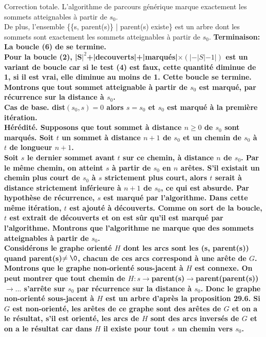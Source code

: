 \documentclass[french, 11pt]{article}
\begin{document}
\begin{prop}{Correction totale.}{}
    L'algorithme de parcours générique marque exactement les sommets atteignables à partir de $s_0$.\\
    De plus, l'ensemble \{\{s, parent(s)\} | parent(s) existe\} est un arbre dont les sommets sont exactement les sommets atteignables à partir de $s_0$.
    \tcblower
    \bf{Terminaison:} La boucle (6) de se termine.\\
    Pour la boucle (2), |S$|^2$+|decouverts|+|marqués|$\times(|-|S|-1|)$ est un variant de boucle car si le test (4) est faux, cette quantité diminue de 1, si il est vrai, elle diminue au moins de 1. Cette boucle se termine.\\
     Montrons que tout sommet atteignable à partir de $s_0$ est marqué, par récurrence sur la distance à $s_0$.\\
    \bf{Cas de base.} dist$(s_0,s)=0$ alors $s=s_0$ et $s_0$ est marqué à la première itération.\\
    \bf{Hérédité.} Supposons que tout sommet à distance $n\geq0$ de $s_0$ sont marqués. Soit $t$ un sommet à distance $n+1$ de $s_0$ et un chemin de $s_0$ à $t$ de longueur $n+1$.\\
    Soit $s$ le dernier sommet avant $t$ sur ce chemin, à distance $n$ de $s_0$. Par le même chemin, on atteint $s$ à partir de $s_0$ en $n$ arêtes. S'il existait un chemin plus court de $s_0$ à $s$ strictement plus court, alors $t$ serait à distance strictement inférieure à $n+1$ de $s_0$, ce qui est absurde. Par hypothèse de récurrence, $s$ est marqué par l'algorithme. Dans cette même itération, $t$ est ajouté à découverts. Comme on sort de la boucle, $t$ est extrait de découverts et on est sûr qu'il est marqué par l'algorithme.\n
     Montrons que l'algorithme ne marque que des sommets atteignables à partir de $s_0$.\\
    Considérons le graphe orienté $H$ dont les arcs sont les (s, parent(s)) quand parent(s)$\neq\0$, chacun de ces arcs correspond à une arête de $G$. Montrons que le graphe non-orienté sous-jacent à $H$ est connexe. On peut montrer que tout chemin de $H:s\to$parent(s)$\to$parent(parent(s))$\to...$ s'arrête sur $s_0$ par récurrence sur la distance à $s_0$. Donc le graphe non-orienté sous-jacent à $H$ est un arbre d'après la proposition 29.6. Si $G$ est non-orienté, les arêtes de ce graphe sont des arêtes de $G$ et on a le résultat, s'il est orienté, les arcs de $H$ sont des arcs inversés de $G$ et on a le résultat car dans $H$ il existe pour tout $s$ un chemin vers $s_0$.
\end{prop}
\end{document}
